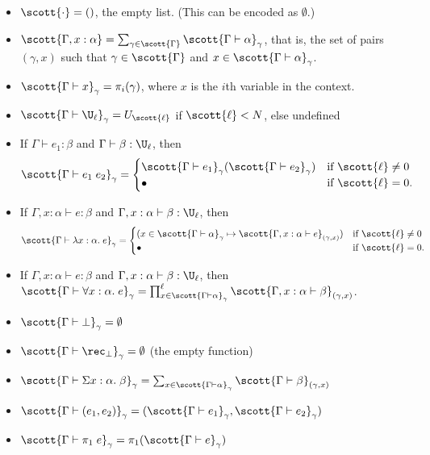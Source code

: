 \begin{itemize}
\item $\scott{\cdot}=()$, the empty list. (This can be encoded as $\emptyset$.)
\item $\scott{\Gamma,x:\alpha}=\sum_{\gamma\in\scott{\Gamma}}\scott{\Gamma\vdash\alpha}_\gamma$, that is, the set of pairs $(\gamma,x)$ such that $\gamma\in\scott{\Gamma}$ and $x\in\scott{\Gamma\vdash\alpha}_\gamma$.
\item $\scott{\Gamma\vdash x}_\gamma=\pi_i(\gamma)$, where $x$ is the $i$th variable in the context.
\item $\scott{\Gamma\vdash\U_\ell}_\gamma=U_{\scott{\ell}}$ if $\scott{\ell}<N$, else undefined
\item If $\Gamma\vdash e_1:\beta$ and $\Gamma\vdash\beta:\U_\ell$, then $$\scott{\Gamma\vdash e_1\;e_2}_\gamma=\begin{cases}
\scott{\Gamma\vdash e_1}_\gamma(\scott{\Gamma\vdash e_2}_\gamma)&\mbox{if }\scott{\ell}\ne 0\\
\bullet&\mbox{if }\scott{\ell}=0.
\end{cases}$$
\item If $\Gamma,x:\alpha\vdash e:\beta$ and $\Gamma,x:\alpha\vdash\beta:\U_\ell$, then
$$\scott{\Gamma\vdash \lambda x:\alpha.\;e}_\gamma=\begin{cases}
(x\in\scott{\Gamma\vdash \alpha}_{\gamma}\mapsto\scott{\Gamma,x:\alpha\vdash e}_{(\gamma,x)})&\mbox{if }\scott{\ell}\ne 0\\
\bullet&\mbox{if }\scott{\ell}=0.
\end{cases}$$
\item If $\Gamma,x:\alpha\vdash e:\beta$ and $\Gamma,x:\alpha\vdash\beta:\U_\ell$, then\\
$\scott{\Gamma\vdash \forall x:\alpha.\;e}_\gamma=\prod^\ell_{x\in \scott{\Gamma\vdash\alpha}_\gamma}\scott{\Gamma,x:\alpha\vdash\beta}_{(\gamma,x)}$.
\item $\scott{\Gamma\vdash\bot}_\gamma=\emptyset$
\item $\scott{\Gamma\vdash\rec_\bot}_\gamma=\emptyset$ (the empty function)
\item $\scott{\Gamma\vdash\Sigma x:\alpha.\;\beta}_\gamma=\sum_{x\in \scott{\Gamma\vdash\alpha}_\gamma}\scott{\Gamma\vdash\beta}_{(\gamma,x)}$
\item $\scott{\Gamma\vdash(e_1,e_2)}_\gamma=(\scott{\Gamma\vdash e_1}_\gamma,\scott{\Gamma\vdash e_2}_\gamma)$
\item $\scott{\Gamma\vdash\pi_1\;e}_\gamma=\pi_1(\scott{\Gamma\vdash e}_\gamma)$

\end{itemize}
